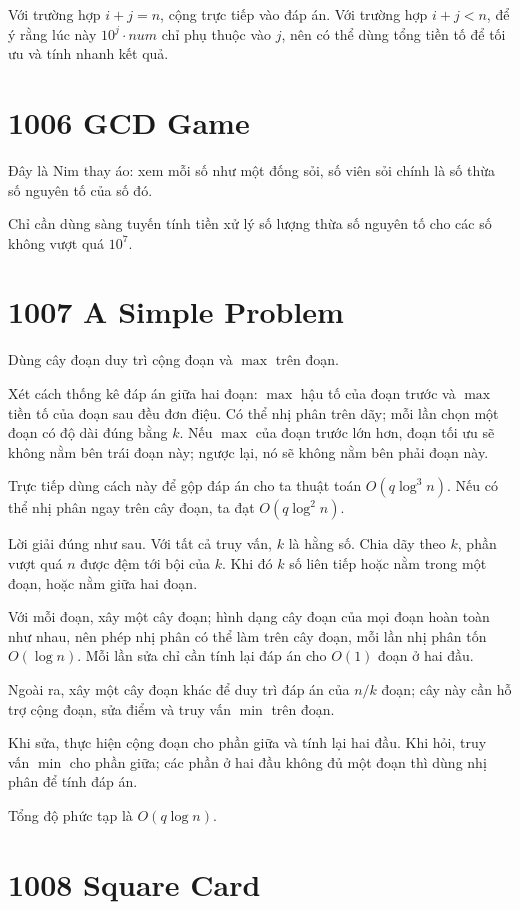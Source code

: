 \documentclass[11pt]{article}
\begin{document}
Với trường hợp $i+j=n$, cộng trực tiếp vào đáp án. Với trường hợp $i+j<n$, để
ý rằng lúc này $10^j\cdot \mathit{num}$ chỉ phụ thuộc vào $j$, nên có thể dùng
tổng tiền tố để tối ưu và tính nhanh kết quả.

\section*{1006 GCD Game}

Đây là Nim thay áo: xem mỗi số như một đống sỏi, số viên sỏi chính là số thừa
số nguyên tố của số đó.

Chỉ cần dùng sàng tuyến tính tiền xử lý số lượng thừa số nguyên tố cho các số
không vượt quá $10^7$.

\section*{1007 A Simple Problem}

Dùng cây đoạn duy trì cộng đoạn và $\max$ trên đoạn.

Xét cách thống kê đáp án giữa hai đoạn: $\max$ hậu tố của đoạn trước và
$\max$ tiền tố của đoạn sau đều đơn điệu. Có thể nhị phân trên dãy; mỗi lần
chọn một đoạn có độ dài đúng bằng $k$. Nếu $\max$ của đoạn trước lớn hơn, đoạn
tối ưu sẽ không nằm bên trái đoạn này; ngược lại, nó sẽ không nằm bên phải
đoạn này.

Trực tiếp dùng cách này để gộp đáp án cho ta thuật toán $O(q\log^3 n)$. Nếu
có thể nhị phân ngay trên cây đoạn, ta đạt $O(q\log^2 n)$.

Lời giải đúng như sau. Với tất cả truy vấn, $k$ là hằng số. Chia dãy theo
$k$, phần vượt quá $n$ được đệm tới bội của $k$. Khi đó $k$ số liên tiếp hoặc
nằm trong một đoạn, hoặc nằm giữa hai đoạn.

Với mỗi đoạn, xây một cây đoạn; hình dạng cây đoạn của mọi đoạn hoàn toàn như
nhau, nên phép nhị phân có thể làm trên cây đoạn, mỗi lần nhị phân tốn
$O(\log n)$. Mỗi lần sửa chỉ cần tính lại đáp án cho $O(1)$ đoạn ở hai đầu.

Ngoài ra, xây một cây đoạn khác để duy trì đáp án của $n/k$ đoạn; cây này cần
hỗ trợ cộng đoạn, sửa điểm và truy vấn $\min$ trên đoạn.

Khi sửa, thực hiện cộng đoạn cho phần giữa và tính lại hai đầu. Khi hỏi, truy
vấn $\min$ cho phần giữa; các phần ở hai đầu không đủ một đoạn thì dùng nhị
phân để tính đáp án.

Tổng độ phức tạp là $O(q\log n)$.

\section*{1008 Square Card}
\end{document}
